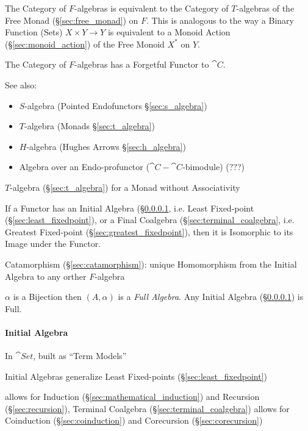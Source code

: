 The Category of $F$-algebras is equivalent to the Category of
$T$-algebras of the Free Monad (\S\ref{sec:free_monad}) on $F$. This
is analogous to the way a Binary Function (Sets) $X \times Y
\rightarrow Y$ is equivalent to a Monoid Action
(\S\ref{sec:monoid_action}) of the Free Monoid $X^*$ on $Y$.

The Category of $F$-algebras has a Forgetful Functor to $\cat{C}$.

\fist See also:
\begin{itemize}
  \item $S$-algebra (Pointed Endofunctors \S\ref{sec:s_algebra})
  \item $T$-algebra (Monads \S\ref{sec:t_algebra})
  \item $H$-algebra (Hughes Arrows \S\ref{sec:h_algebra})
  \item Algebra over an Endo-profunctor ($\cat{C}-\cat{C}$-bimodule)
    (???) %
\end{itemize}

$T$-algebra (\S\ref{sec:t_algebra}) for a Monad without Associativity

If a Functor has an Initial Algebra (\S\ref{sec:initial_algebra},
i.e. Least Fixed-point (\S\ref{sec:least_fixedpoint}), or a Final
Coalgebra (\S\ref{sec:terminal_coalgebra}, i.e. Greatest Fixed-point
(\S\ref{sec:greatest_fixedpoint}), then it is Isomorphic to its Image
under the Functor. \cite{corfield08}

Catamorphism (\S\ref{sec:catamorphism}): unique Homomorphism from the
Initial Algebra to any orther $F$-algebra

$\alpha$ is a Bijection then $(A,\alpha)$ is a \emph{Full Algebra}.
Any Initial Algebra (\S\ref{sec:initial_algebra}) is Full.
\cite{aczel88}



\paragraph{Initial Algebra}\label{sec:initial_algebra}\hfill

In $\cat{Set}$, built as ``Term Models'' \cite{corfield08} %

Initial Algebras generalize Least Fixed-points
(\S\ref{sec:least_fixedpoint}) \cite{rutten00}

allows for Induction (\S\ref{sec:mathematical_induction}) and
Recursion (\S\ref{sec:recursion}), Terminal Coalgebra
(\S\ref{sec:terminal_coalgebra}) allows for Coinduction
(\S\ref{sec:coinduction}) and Corecursion (\S\ref{sec:corecursion})

